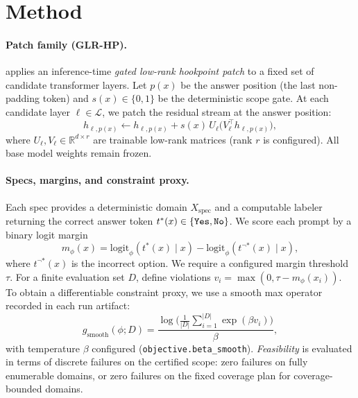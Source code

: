 \section{Method}
\label{sec:method}

\paragraph{Patch family (GLR-HP).}
\Method applies an inference-time \emph{gated low-rank hookpoint patch} to a fixed set of candidate transformer layers.
Let $p(x)$ be the answer position (the last non-padding token) and $s(x)\in\{0,1\}$ be the deterministic scope gate.
At each candidate layer $\ell\in\mathcal{L}$, we patch the residual stream at the answer position:
\begin{equation}
 h_{\ell,p(x)} \leftarrow h_{\ell,p(x)} + s(x)\,U_\ell\big(V_\ell^\top h_{\ell,p(x)}\big),
 \label{eq:glrhp}
\end{equation}
where $U_\ell, V_\ell\in\mathbb{R}^{d\times r}$ are trainable low-rank matrices (rank $r$ is configured).
All base model weights remain frozen.

\paragraph{Specs, margins, and constraint proxy.}
Each spec provides a deterministic domain $X_{\text{spec}}$ and a computable labeler returning the correct answer token $t^*(x)\in\{\texttt{Yes},\texttt{No}\}$.
We score each prompt by a binary logit margin
\begin{equation}
 m_\phi(x) = \mathrm{logit}_{\phi}(t^*(x)\mid x) - \mathrm{logit}_{\phi}(t^{\neg *}(x)\mid x),
\end{equation}
where $t^{\neg *}(x)$ is the incorrect option.
We require a configured margin threshold $\tau$.
For a finite evaluation set $D$, define violations $v_i=\max(0, \tau - m_\phi(x_i))$.
To obtain a differentiable constraint proxy, we use a smooth max operator recorded in each run artifact:
\begin{equation}
 g_{\text{smooth}}(\phi;D) = \frac{\log\Big(\frac{1}{|D|}\sum_{i=1}^{|D|} \exp(\beta v_i)\Big)}{\beta},
 \label{eq:gsmooth}
\end{equation}
with temperature $\beta$ configured (\texttt{objective.beta\_smooth}).
\emph{Feasibility} is evaluated in terms of discrete failures on the certified scope: zero failures on fully enumerable domains, or zero failures on the fixed coverage plan for coverage-bounded domains.

